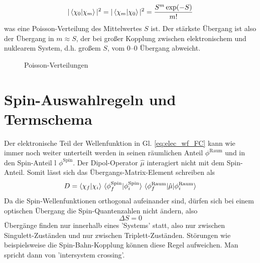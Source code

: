 \begin{equation}
 | \braket{ \chi_0 | \chi_m } | ^2  =  | \braket{ \chi_m | \chi_0 } | ^2 = \frac{S^m \exp(-S)}{m!}
\end{equation}
was eine Poisson-Verteilung des Mittelwertes $S$ ist.  Der stärkste Übergang ist also der Übergang in $m \approx S$, der bei großer Kopplung zwischen elektronischem und nuklearem System, d.h. großem $S$, vom 0--0 Übergang abweicht.

\begin{figure}
  \caption{Poisson-Verteilungen}
\end{figure}


\section{Spin-Auswahlregeln und Termschema}

Der elektronische Teil der Wellenfunktion in Gl. \ref{eq:elec_wf_FC} kann wie immer noch weiter unterteilt werden in seinen räumlichen Anteil $\phi^\text{Raum}$ und in den Spin-Anteil l $\phi^\text{Spin}$. Der Dipol-Operator $\hat{\mu}$ interagiert nicht mit dem Spin-Anteil. Somit lässt sich das Übergangs-Matrix-Element schreiben als
\begin{equation}
 D =   \braket{\chi_f | \chi_i} \,    \braket{\phi^\text{Spin}_f | \phi^\text{Spin}_i}  \,
  \braket{\phi^\text{Raum}_f | \hat{\mu} | \phi^\text{Raum}_i} 
\end{equation}
Da die Spin-Wellenfunktionen orthogonal aufeinander sind, dürfen sich bei einem optischen Übergang die Spin-Quantenzahlen nicht ändern, also
\begin{equation}
 \Delta S = 0
\end{equation}
Übergänge finden nur innerhalb eines 'Systems' statt, also nur zwischen  Singulett-Zuständen und nur zwischen   Triplett-Zuständen.
Störungen wie beispielsweise die Spin-Bahn-Kopplung können diese Regel aufweichen. Man spricht dann von 'intersystem crossing'.

